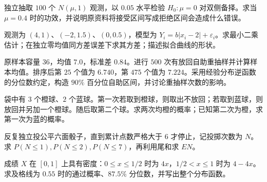 \begin{exercise}[双侧检验在指定备择下的功效]\label{q:M-F-11}
独立抽取 $100$ 个 $N(\mu,1)$ 观测，以 $0.05$ 水平检验 $H_0:\mu=0$ 对双侧备择。求当 $\mu=0.4$ 时的功效，并说明原资料将接受区间写成拒绝区间会造成什么错误。\par{}\end{exercise}

\begin{exercise}[折线基函数的最小二乘]\label{q:M-F-12}
观测为 $(4,1)$、$(-2,1.5)$、$(0,0.5)$，模型为 $Y_i=b|x_i-2|+\varepsilon_i$。求最小二乘估计；在独立零均值同方差误差下求其方差；描述拟合曲线的形状。\par{}\end{exercise}

\begin{exercise}[自助分位数的读法]\label{q:M-F-13}
原样本容量 $36$，均值 $7.0$，标准差 $0.84$。进行 $500$ 次有放回自助重抽样并计算样本均值。排序后第 $25$ 个值为 $6.740$，第 $475$ 个值为 $7.224$。采用经验分布逆函数的分位数约定，构造 $90\%$ 百分位自助区间，并讨论重抽样次数的影响。\par{}\end{exercise}

\begin{exercise}[抽球机制与逆向条件概率]\label{q:M-PF-18}
袋中有 $3$ 个橙球、$2$ 个蓝球。第一次若取到橙球，则取出不放回；若取到蓝球，则放回并另加一个橙球。随后取第二个球。求两次均橙的概率；已知第二次为橙，求第一次为蓝的概率。\par{}\end{exercise}

\begin{exercise}[停时分布的边界计算]\label{q:M-PF-19}
反复独立投公平六面骰子，直到累计点数严格大于 $6$ 才停止，记投掷次数为 $N$。求 $P(N\le1),P(N\le2),P(N\le7)$，再利用尾和求 $EN$。\par{}\end{exercise}

\begin{exercise}[分段密度与分位数]\label{q:M-PF-20}
成绩 $X$ 在 $[0,1]$ 上具有密度：$0\le x\le1/2$ 时为 $4x$，$1/2<x\le1$ 时为 $4-4x$。求及格线为 $0.55$ 时的通过概率、$87.5\%$ 分位数，并写出整个分布函数。\par{}\end{exercise}

